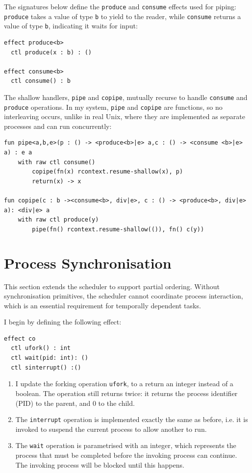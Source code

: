 \documentclass[logo,bsc,singlespacing,parskip]{infthesis}
\begin{document}
The signatures below define the \lstinline{produce} and \lstinline{consume} effects used for piping: \lstinline{produce} takes a value of type \lstinline{b} to yield to the reader, while \lstinline{consume} returns a value of type \lstinline{b}, indicating it waits for input:

\begin{lstlisting}
effect produce<b>
  ctl produce(x : b) : ()   

effect consume<b>
  ctl consume() : b         

\end{lstlisting}

The shallow handlers, \lstinline{pipe} and \lstinline{copipe}, mutually recurse to handle \lstinline{consume} and \lstinline{produce} operations. In my system, \lstinline{pipe} and \lstinline{copipe} are  functions, so no interleaving occurs, unlike in real Unix, where they are implemented as separate processes and can run concurrently:

\begin{lstlisting}
fun pipe<a,b,e>(p : () -> <produce<b>|e> a,c : () -> <consume <b>|e> a) : e a
    with raw ctl consume()
        copipe(fn(x) rcontext.resume-shallow(x), p)
        return(x) -> x

fun copipe(c : b -><consume<b>, div|e>, c : () -> <produce<b>, div|e> a): <div|e> a
    with raw ctl produce(y)
        pipe(fn() rcontext.resume-shallow(()), fn() c(y))
\end{lstlisting}

\section{Process Synchronisation}

This section extends the scheduler to support partial ordering. Without synchronisation primitives, the scheduler cannot coordinate process interaction, which is an essential requirement for temporally dependent tasks.


I begin by defining the following effect:
\begin{lstlisting}
effect co
  ctl ufork() : int
  ctl wait(pid: int): ()
  ctl sinterrupt() :()
\end{lstlisting}

\begin{enumerate}
    \item I update the forking operation \lstinline{ufork}, to a return an integer instead of a boolean. The operation still returns twice: it returns the process identifier (PID) to the parent, and 0 to the child. 

    \item The \lstinline{interrupt} operation is implemented exactly the same as before, i.e. it is invoked to suspend the current process to allow another to run. 

    \item The \lstinline{wait} operation is parametrised with an integer, which represents the process that must be completed before the invoking process can continue. The invoking process will be blocked until this happens.
\end{enumerate}
\end{document}
